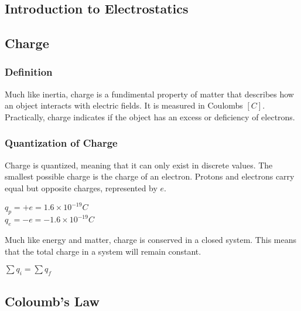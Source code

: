 \begin{center}
    \section{Introduction to Electrostatics}
    \hrulefill
    \subsection*{Charge}
\end{center}

\subsubsection*{Definition}

\hspace{.5cm}
Much like inertia, charge is a fundimental property of matter that describes how an object interacts with 
electric fields. It is measured in Coulombs $[C]$. Practically, charge indicates if the object has an excess 
or deficiency of electrons.

\subsubsection*{Quantization of Charge}
\hspace{.5cm}
Charge is quantized, meaning that it can only exist in discrete values. 
The smallest possible charge is the charge of an electron. Protons and electrons carry equal but opposite charges, 
represented by $e$.

\begin{center}
    $q_p = +e = 1.6 \times 10^{-19}C$\\
    $q_e = -e = -1.6 \times 10^{-19}C$
\end{center}

Much like energy and matter, charge is conserved in a closed system. This means that the total charge in a system
will remain constant. 

\begin{center}
    $\sum q_i = \sum q_f$
\end{center}

\hrulefill

\begin{center}
    \subsection*{Coloumb's Law}
\end{center}

